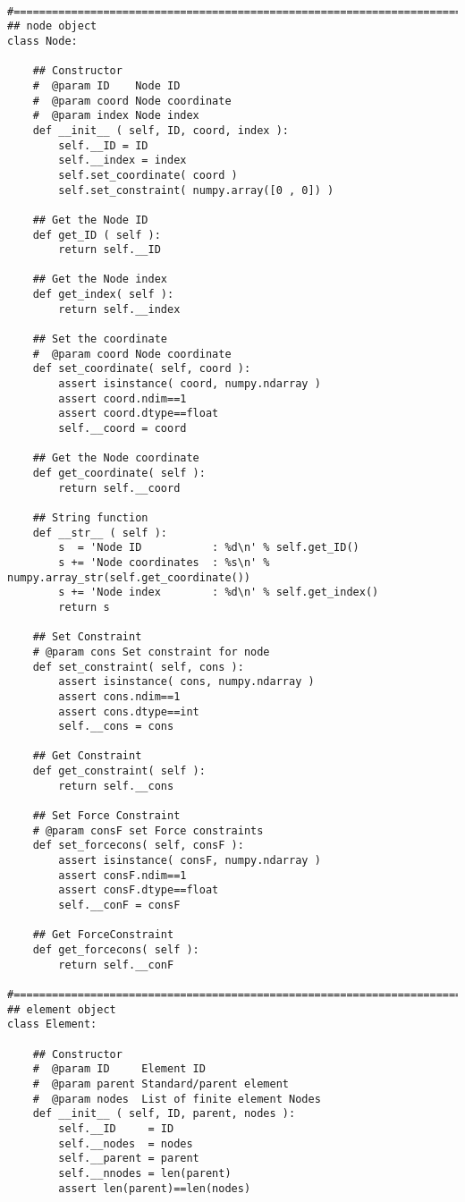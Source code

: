 \begin{appendices}
\begin{verbatim}
       
#==============================================================================#
## node object
class Node:
    
    ## Constructor
    #  @param ID    Node ID
    #  @param coord Node coordinate
    #  @param index Node index
    def __init__ ( self, ID, coord, index ):
        self.__ID = ID
        self.__index = index
        self.set_coordinate( coord )
        self.set_constraint( numpy.array([0 , 0]) )

    ## Get the Node ID
    def get_ID ( self ):
        return self.__ID
    
    ## Get the Node index    
    def get_index( self ):
        return self.__index
    
    ## Set the coordinate
    #  @param coord Node coordinate   
    def set_coordinate( self, coord ):
        assert isinstance( coord, numpy.ndarray )
        assert coord.ndim==1
        assert coord.dtype==float
        self.__coord = coord

    ## Get the Node coordinate
    def get_coordinate( self ):
        return self.__coord
        
    ## String function
    def __str__ ( self ):
        s  = 'Node ID           : %d\n' % self.get_ID()
        s += 'Node coordinates  : %s\n' % numpy.array_str(self.get_coordinate())
        s += 'Node index        : %d\n' % self.get_index()
        return s
    
    ## Set Constraint
    # @param cons Set constraint for node
    def set_constraint( self, cons ):
        assert isinstance( cons, numpy.ndarray )
        assert cons.ndim==1
        assert cons.dtype==int
        self.__cons = cons
        
    ## Get Constraint
    def get_constraint( self ):
        return self.__cons

    ## Set Force Constraint
    # @param consF set Force constraints
    def set_forcecons( self, consF ):
        assert isinstance( consF, numpy.ndarray )
        assert consF.ndim==1
        assert consF.dtype==float
        self.__conF = consF

    ## Get ForceConstraint
    def get_forcecons( self ):
        return self.__conF

#==============================================================================
## element object
class Element:

    ## Constructor
    #  @param ID     Element ID
    #  @param parent Standard/parent element
    #  @param nodes  List of finite element Nodes
    def __init__ ( self, ID, parent, nodes ):
        self.__ID     = ID
        self.__nodes  = nodes
        self.__parent = parent
        self.__nnodes = len(parent)
        assert len(parent)==len(nodes)


\end{verbatim}
\end{appendices}

